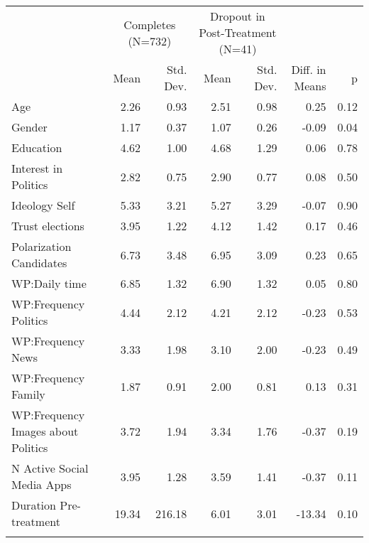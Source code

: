 \begin{table}

\caption{}
\centering
\begin{tabular}[t]{lrrrrrr}
\toprule
\multicolumn{1}{c}{ } & \multicolumn{2}{c}{Completes (N=732)} & \multicolumn{2}{c}{Dropout in Post-Treatment (N=41)} & \multicolumn{2}{c}{ } \\
\cmidrule(l{3pt}r{3pt}){2-3} \cmidrule(l{3pt}r{3pt}){4-5}
  & Mean & Std. Dev. & Mean & Std. Dev. & Diff. in Means & p\\
\midrule
Age & 2.26 & 0.93 & 2.51 & 0.98 & 0.25 & 0.12\\
Gender & 1.17 & 0.37 & 1.07 & 0.26 & -0.09 & 0.04\\
Education & 4.62 & 1.00 & 4.68 & 1.29 & 0.06 & 0.78\\
Interest in Politics & 2.82 & 0.75 & 2.90 & 0.77 & 0.08 & 0.50\\
Ideology Self & 5.33 & 3.21 & 5.27 & 3.29 & -0.07 & 0.90\\
Trust elections & 3.95 & 1.22 & 4.12 & 1.42 & 0.17 & 0.46\\
Polarization Candidates & 6.73 & 3.48 & 6.95 & 3.09 & 0.23 & 0.65\\
WP:Daily time & 6.85 & 1.32 & 6.90 & 1.32 & 0.05 & 0.80\\
WP:Frequency Politics & 4.44 & 2.12 & 4.21 & 2.12 & -0.23 & 0.53\\
WP:Frequency News & 3.33 & 1.98 & 3.10 & 2.00 & -0.23 & 0.49\\
WP:Frequency Family & 1.87 & 0.91 & 2.00 & 0.81 & 0.13 & 0.31\\
WP:Frequency Images about Politics & 3.72 & 1.94 & 3.34 & 1.76 & -0.37 & 0.19\\
N Active Social Media Apps & 3.95 & 1.28 & 3.59 & 1.41 & -0.37 & 0.11\\
Duration Pre-treatment & 19.34 & 216.18 & 6.01 & 3.01 & -13.34 & 0.10\\
\bottomrule
\multicolumn{7}{l}{\rule{0pt}{1em}}\\
\end{tabular}
\end{table}
